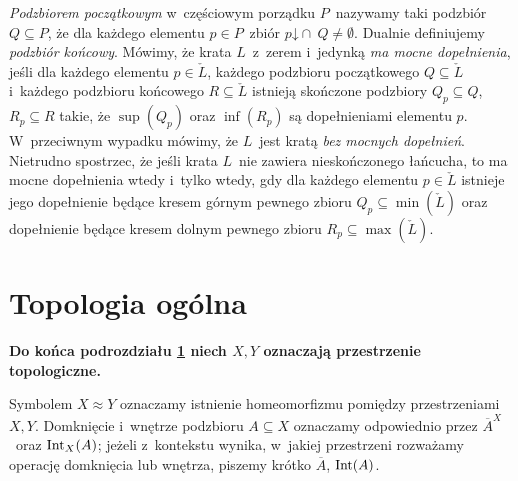 \textit{Podzbiorem początkowym} w~częściowym porządku $P$~nazywamy taki podzbiór $Q\subseteq P$, że dla każdego elementu $p\in P$~zbiór $p\mathord{\downarrow}\cap\ Q\not=\emptyset$. Dualnie definiujemy \textit{podzbiór końcowy}. Mówimy, że krata $L$~z~zerem i~jedynką \textit{ma mocne dopełnienia}, jeśli dla każdego elementu $p\in\check{L}$, każdego podzbioru początkowego $Q\subseteq \check{L}$ i~każdego podzbioru końcowego $R\subseteq \check{L}$ istnieją skończone podzbiory $Q_p\subseteq Q$, $R_p\subseteq R$ takie, że $\sup(Q_p)$ oraz $\inf(R_p)$ są dopełnieniami elementu $p$. W~przeciwnym wypadku mówimy, że $L$~jest kratą \textit{bez mocnych dopełnień}. Nietrudno spostrzec, że jeśli krata $L$~nie zawiera nieskończonego łańcucha, to ma mocne dopełnienia wtedy i~tylko wtedy, gdy dla każdego elementu $p\in\check{L}$ istnieje jego dopełnienie będące kresem górnym pewnego zbioru $Q_p\subseteq \min(\check{L})$ oraz dopełnienie będące kresem dolnym pewnego zbioru $R_p\subseteq \max(\check{L})$.








\section{Topologia ogólna}\label{sec-top_ogolna}
\textbf{Do końca podrozdziału \ref{sec-top_ogolna} niech $X, Y$ oznaczają przestrzenie topologiczne.}

Symbolem $X \approx Y$ oznaczamy istnienie homeomorfizmu pomiędzy przestrzeniami $X, Y$. Domknięcie i~wnętrze podzbioru $A\subseteq X$ oznaczamy odpowiednio przez $\overline{A}^X$~oraz $\operatorname{Int}_X(A)$; jeżeli z~kontekstu wynika, w~jakiej przestrzeni rozważamy operację domknięcia lub wnętrza, piszemy krótko $\overline{A}$, $\operatorname{Int}(A)$.

